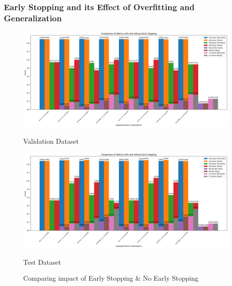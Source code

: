 \documentclass{article}
\begin{document}
\subsubsection*{Early Stopping and its Effect of Overfitting and Generalization}
\begin{figure}[H] %
    \centering
    \begin{minipage}{0.49\linewidth}
        \centering
        \includegraphics[width=\linewidth]{assets/fV.png}
        \caption{Validation Dataset}{}
        \label{fig:b-1}
    \end{minipage}
    \hfill
    \begin{minipage}{0.49\linewidth}
        \centering
        \includegraphics[width=\linewidth]{assets/fT.png}
        \caption{Test Dataset}{}
        \label{fig:b-2}
    \end{minipage}
    \caption*{Comparing impact of Early Stopping \& No Early Stopping}
\end{figure}
\end{document}
